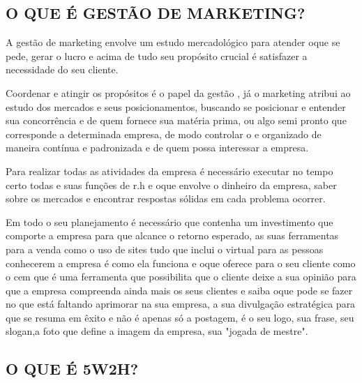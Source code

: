 \documentclass[article, a4paper, 12pt, brazil]{abntex2}
\begin{document}
   \subsection{O QUE É GESTÃO DE MARKETING?}

   \par A gestão de marketing envolve um estudo mercadológico para atender oque se pede, gerar o lucro e acima de tudo seu propósito crucial é satisfazer a necessidade do seu cliente.\\
   \par Coordenar e atingir os propósitos é o papel da gestão , já o marketing atribui ao estudo dos mercados e seus posicionamentos, buscando se posicionar e entender sua concorrência e de quem fornece sua matéria prima, ou algo semi pronto que corresponde a determinada empresa, de modo controlar o e organizado de maneira contínua e padronizada e de quem possa interessar a empresa.\\
   \par Para realizar todas as atividades da empresa é necessário executar no tempo certo todas e suas funções de r.h e oque envolve o dinheiro da empresa, saber sobre os mercados e encontrar respostas sólidas em cada problema ocorrer.\\
   \par Em todo o seu planejamento é necessário que contenha um investimento que comporte a empresa para que alcance o retorno esperado, as suas ferramentas para a venda como o uso de sites tudo que inclui o virtual para as pessoas conhecerem a empresa é como ela funciona e oque oferece para o seu cliente como o cem que é uma ferramenta que possibilita que o cliente deixe a sua opinião para que a empresa compreenda ainda mais os seus clientes e saiba oque pode se fazer no que está faltando aprimorar na sua empresa, a sua divulgação estratégica para que se resuma em êxito e não é apenas só a postagem, é o seu logo, sua frase, seu slogan,a foto que define a imagem da empresa, sua "jogada de mestre".\\
   \subsection{O QUE É 5W2H?}
\end{document}
